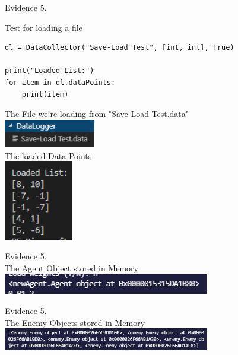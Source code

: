 \begin{flushleft}
\begin{center}
        {\large Evidence 5.\rn } \\ 
        \vspace{0.3cm}

        Test for loading a file
        \begin{verbatim}
dl = DataCollector("Save-Load Test", [int, int], True)

print("Loaded List:")
for item in dl.dataPoints:
    print(item)
        \end{verbatim}

        The File we're loading from "Save-Load Test.data" \\
        \includegraphics[width=4cm]{Images/Testing/T4.8.2.PNG} \\
        The loaded Data Points \\
        \includegraphics[width=3cm]{Images/Testing/T4.9.1.PNG} \\
        \vspace{1cm}
    \end{center}
   

    \setcounter{magicrownumbers}{0}
    \begin{center}
        {\large Evidence 5.\rn } \\ 
        \vspace{0.3cm}
        The Agent Object stored in Memory \\
        \includegraphics[width=9cm]{Images/Testing/T5.1.1.PNG} \\
        \vspace{1cm}
    
        {\large Evidence 5.\rn } \\ 
        \vspace{0.3cm}
        The Enemy Objects stored in Memory \\
        \includegraphics[width=9cm]{Images/Testing/T5.2.1.PNG} \\
        \vspace{1cm}


\end{center}
\end{flushleft}
